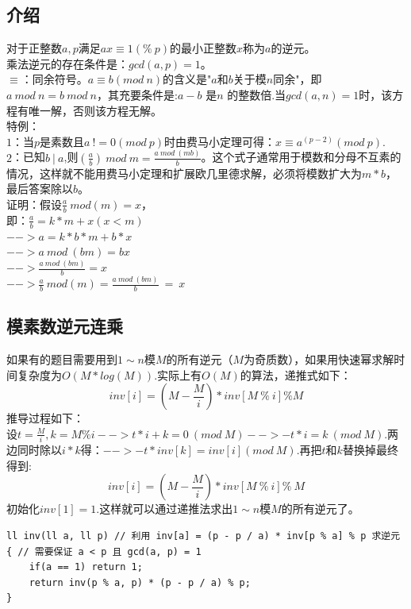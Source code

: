 \subsection{介绍}
对于正整数$a,p$满足$ax \equiv 1 (\% \ p)$的最小正整数$x$称为$a$的逆元。 \\
乘法逆元的存在条件是：$gcd(a,p)=1$。 \\
$\equiv$：同余符号。$a \equiv b (mod \ n)$的含义是"$a$和$b$关于模$n$同余"，即$a\  mod\ n = b\ mod\ n$，其充要条件是:$a - b$ 是$n$ 的整数倍.当$gcd(a, n) = 1$时，该方程有唯一解，否则该方程无解。  \\
特例： \\
$1$：当$p$是素数且$a\ != 0 (mod\ p)$时由费马小定理可得：$x \equiv a ^{(p - 2)} (mod\ p)$. \\
$2$：已知$b\ |\ a$,则$(\frac{a}{b})\ mod\ m=\frac{a\  mod\  (mb)} {b}$。这个式子通常用于模数和分母不互素的情况，这样就不能用费马小定理和扩展欧几里德求解，必须将模数扩大为$m*b$，最后答案除以$b$。 \\
证明：假设$\frac{a}{b}\ mod (m) = x$， \\
即：$\frac{a}{b} = k * m + x (x < m)$ \\
$-->a = k * b * m + b * x$ \\
$-->a\ mod\ (bm) = bx$ \\
$-->\frac{a\ mod\ (bm)}{b} = x$ \\
$-->\frac{a}{b}\ mod(m) =\frac{a\ mod\  (bm)}{b}\ = \ x$ \\

\subsection{模素数逆元连乘}

如果有的题目需要用到$1\sim n$模$M$的所有逆元（$M$为奇质数），如果用快速幂求解时间复杂度为$O(M*log(M))$.实际上有$O(M)$的算法，递推式如下： \\
$$inv[i] = (M - \frac{M}{i} ) * inv[M\  \%\  i] \% M$$
推导过程如下： \\
设$t = \frac{M} {i},k = M \% i --> t * i + k = 0\ (mod\ M) -->-t * i = k\ (mod\ M)$.两边同时除以$i * k$得：$--> -t * inv[k] = inv[i](mod\  M)$.再把$t$和$k$替换掉最终得到:
$$inv[i] = (M - \frac{M} {i}) * inv[M\  \%\  i] \% \ M$$
初始化$inv[1] = 1$.这样就可以通过递推法求出$1\sim n$模$M$的所有逆元了。

\begin{lstlisting}
ll inv(ll a, ll p) // 利用 inv[a] = (p - p / a) * inv[p % a] % p 求逆元
{ // 需要保证 a < p 且 gcd(a, p) = 1
	if(a == 1) return 1;
	return inv(p % a, p) * (p - p / a) % p;
}
\end{lstlisting}

